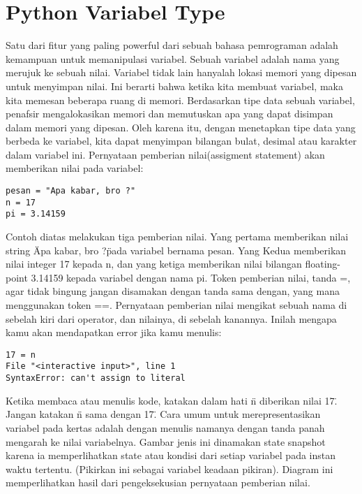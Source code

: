 
\section{Python Variabel Type}
Satu dari fitur yang paling powerful dari sebuah bahasa pemrograman adalah kemampuan untuk memanipulasi variabel. Sebuah variabel adalah nama yang merujuk ke sebuah nilai. Variabel tidak lain hanyalah lokasi memori yang dipesan untuk menyimpan nilai. Ini berarti bahwa ketika kita membuat variabel, maka kita memesan beberapa ruang di memori. Berdasarkan tipe data sebuah variabel, penafsir mengalokasikan memori dan memutuskan apa yang dapat disimpan dalam memori yang dipesan. Oleh karena itu, dengan menetapkan tipe data yang berbeda ke variabel, kita dapat menyimpan bilangan bulat, desimal atau karakter dalam variabel ini.
Pernyataan pemberian nilai(assigment statement) akan memberikan nilai pada variabel: 
\begin{verbatim}
pesan = "Apa kabar, bro ?" 
n = 17  
pi = 3.14159 
\end{verbatim}
Contoh diatas melakukan tiga pemberian nilai. Yang pertama memberikan nilai string \"Apa kabar, bro ?\" pada variabel bernama pesan. Yang Kedua memberikan nilai integer 17 kepada n, dan yang ketiga memberikan nilai bilangan floating-point 3.14159 kepada variabel dengan nama pi.
Token pemberian nilai, tanda =, agar tidak bingung jangan disamakan dengan tanda sama dengan, yang mana menggunakan token ==. Pernyataan pemberian nilai mengikat sebuah nama di sebelah kiri dari operator, dan nilainya, di sebelah kanannya. Inilah mengapa kamu akan mendapatkan error jika kamu menulis: 
\begin{verbatim}
17 = n 
File "<interactive input>", line 1 
SyntaxError: can't assign to literal 
\end{verbatim}
Ketika membaca atau menulis kode, katakan dalam hati \"n diberikan nilai 17\". Jangan katakan \"n sama dengan 17\".
Cara umum untuk merepresentasikan variabel pada kertas adalah dengan menulis namanya dengan tanda panah mengarah ke nilai variabelnya. Gambar jenis ini dinamakan state snapshot karena ia memperlihatkan state atau kondisi dari setiap variabel pada instan waktu tertentu. (Pikirkan ini sebagai variabel keadaan pikiran). Diagram ini memperlihatkan hasil dari pengeksekusian pernyataan pemberian nilai.
